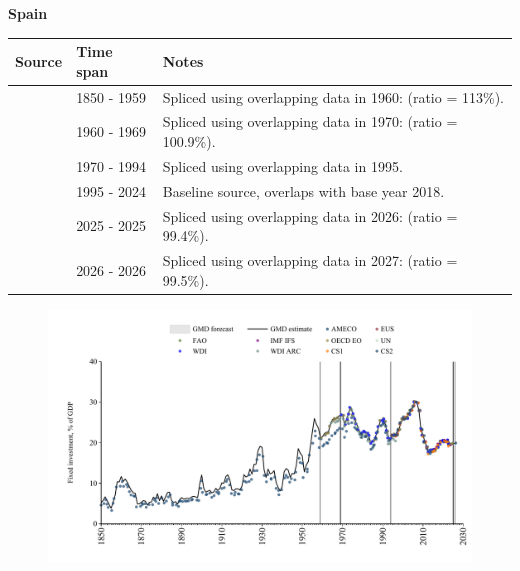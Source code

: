 \documentclass[12pt,a4paper,landscape]{article}
\begin{document}
\begin{adjustbox}{max totalsize={\paperwidth}{\paperheight},center}
\begin{minipage}[t][\textheight][t]{\textwidth}
\vspace*{0.5cm}
{}
\begin{center}
{\Large\bfseries Spain}
\end{center}
\vspace{0.5cm}
\begin{table}[H]
\centering
\small
\begin{tabular}{|l|l|l|}
\hline
\textbf{Source} & \textbf{Time span} & \textbf{Notes} \\
\hline
\rowcolor{white}\cite{CS2_ESP}& 1850 - 1959 &Spliced using overlapping data in 1960: (ratio = 113\%).\\
\rowcolor{lightgray}\cite{OECD_EO}& 1960 - 1969 &Spliced using overlapping data in 1970: (ratio = 100.9\%).\\
\rowcolor{white}\cite{WDI}& 1970 - 1994 &Spliced using overlapping data in 1995.\\
\rowcolor{lightgray}\cite{EUS}& 1995 - 2024 &Baseline source, overlaps with base year 2018.\\
\rowcolor{white}\cite{OECD_EO}& 2025 - 2025 &Spliced using overlapping data in 2026: (ratio = 99.4\%).\\
\rowcolor{lightgray}\cite{AMECO}& 2026 - 2026 &Spliced using overlapping data in 2027: (ratio = 99.5\%).\\
\hline
\end{tabular}
\end{table}
\begin{figure}[H]
\centering
\includegraphics[width=\textwidth,height=0.6\textheight,keepaspectratio]{graphs/ESP_finv_GDP.pdf}
\end{figure}
\end{minipage}
\end{adjustbox}
\end{document}
